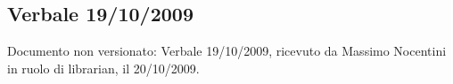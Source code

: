 \subsection{Verbale 19/10/2009}
Documento non versionato: Verbale 19/10/2009, ricevuto da Massimo Nocentini in ruolo di librarian, il 20/10/2009. 
